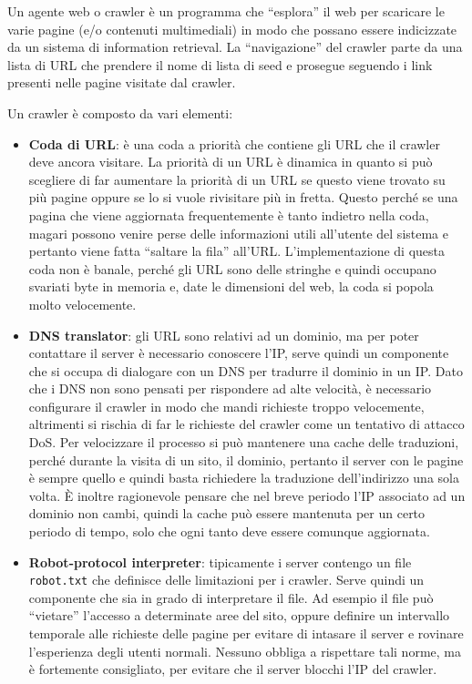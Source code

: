 Un agente web o crawler è un programma che ``esplora'' il web per scaricare le varie pagine (e/o contenuti multimediali) in modo che possano essere indicizzate da un sistema di information retrieval.
La ``navigazione'' del crawler parte da una lista di URL che prendere il nome di lista di seed e prosegue seguendo i link presenti nelle pagine visitate dal crawler.

Un crawler è composto da vari elementi:

\begin{itemize}
	\item \textbf{Coda di URL}: è una coda a priorità che contiene gli URL che il crawler deve ancora visitare. La priorità di un URL è dinamica in quanto si può scegliere di far aumentare la priorità di un URL se questo viene trovato su più pagine oppure se lo si vuole rivisitare più in fretta. Questo perché se una pagina che viene aggiornata frequentemente è tanto indietro nella coda, magari possono venire perse delle informazioni utili all'utente del sistema e pertanto viene fatta ``saltare la fila'' all'URL. L'implementazione di questa coda non è banale, perché gli URL sono delle stringhe e quindi occupano svariati byte in memoria e, date le dimensioni del web, la coda si popola molto velocemente.
	\item \textbf{DNS translator}: gli URL sono relativi ad un dominio, ma per poter contattare il server è necessario conoscere l'IP, serve quindi un componente che si occupa di dialogare con un DNS per tradurre il dominio in un IP. Dato che i DNS non sono pensati per rispondere ad alte velocità, è necessario configurare il crawler in modo che mandi richieste troppo velocemente, altrimenti si rischia di far le richieste del crawler come un tentativo di attacco DoS. Per velocizzare il processo si può mantenere una cache delle traduzioni, perché durante la visita di un sito, il dominio, pertanto il server con le pagine è sempre quello e quindi basta richiedere la traduzione dell'indirizzo una sola volta. \`E inoltre ragionevole pensare che nel breve periodo l'IP associato ad un dominio non cambi, quindi la cache può essere mantenuta per un certo periodo di tempo, solo che ogni tanto deve essere comunque aggiornata.
	\item \textbf{Robot-protocol interpreter}: tipicamente i server contengo un file \texttt{robot.txt} che definisce delle limitazioni per i crawler. Serve quindi un componente che sia in grado di interpretare il file. Ad esempio il file può ``vietare'' l'accesso a determinate aree del sito, oppure definire un intervallo temporale alle richieste delle pagine per evitare di intasare il server e rovinare l'esperienza degli utenti normali. Nessuno obbliga a rispettare tali norme, ma è fortemente consigliato, per evitare che il server blocchi l'IP del crawler.

\end{itemize}
